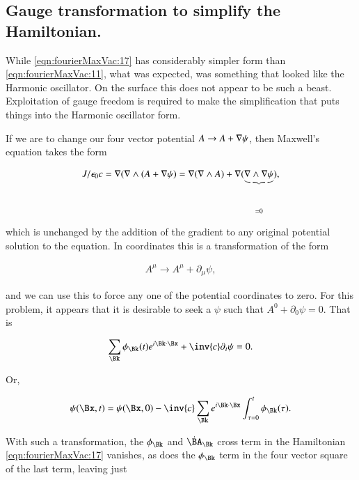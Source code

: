 \subsection{Gauge transformation to simplify the Hamiltonian.}

While \autoref{eqn:fourierMaxVac:17} has considerably simpler form than \autoref{eqn:fourierMaxVac:11}, what was expected, was something that looked like the Harmonic oscillator.  On the surface this does not appear to be such a beast.  Exploitation of gauge freedom is required to make the simplification that puts things into the Harmonic oscillator form.

If we are to change our four vector potential $A \rightarrow A + \nabla \psi$, then Maxwell's equation takes the form

\begin{align}\label{eqn:fourierMaxVac:30}
J/\epsilon_0 c = \nabla (\nabla \wedge (A + \nabla \psi) = \nabla (\nabla \wedge A) + \nabla (\underbrace{\nabla \wedge \nabla \psi}_{=0}),
\end{align}

which is unchanged by the addition of the gradient to any original potential solution to the equation.  In coordinates this is a transformation of the form

\begin{align}\label{eqn:fourierMaxVac:31}
A^\mu \rightarrow A^\mu + \partial_\mu \psi,
\end{align}

and we can use this to force any one of the potential coordinates to zero.  For this problem, it appears that it is desirable to seek a $\psi$ such that $A^0 + \partial_0 \psi = 0$.  That is

\begin{align}\label{eqn:fourierMaxVac:32}
\sum_\Bk \phi_\Bk(t) e^{i \Bk \cdot \Bx} + \inv{c} \partial_t \psi = 0.
\end{align}

Or,

\begin{align}\label{eqn:fourierMaxVac:33}
\psi(\Bx,t) = \psi(\Bx,0) -\inv{c} \sum_\Bk e^{i \Bk \cdot \Bx} \int_{\tau=0}^t \phi_\Bk(\tau).
\end{align}

With such a transformation, the $\phi_\Bk$ and $\dot{\BA}_\Bk$ cross term in the Hamiltonian \autoref{eqn:fourierMaxVac:17} vanishes, as does the $\phi_\Bk$ term in the four vector square of the last term, leaving just

